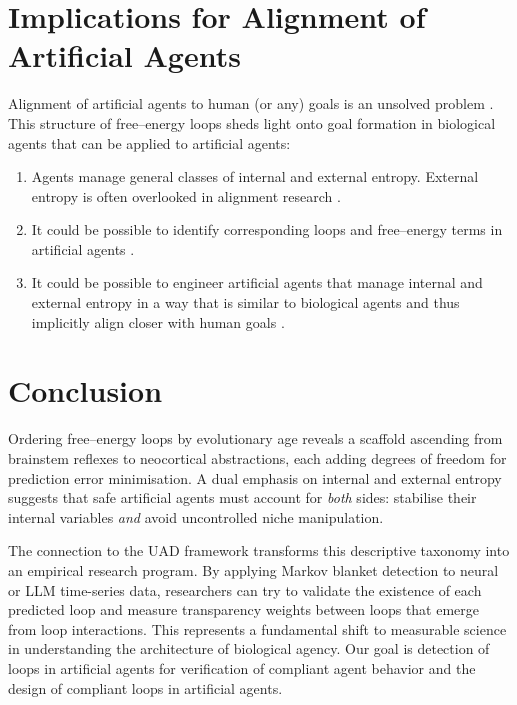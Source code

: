 \documentclass[10pt]{article}
\begin{document}
\section{Implications for Alignment of Artificial Agents}
Alignment of artificial agents to human (or any) goals is an unsolved problem \cite{russell2019human, ngo2022alignment, miri2024problem}.
This structure of free--energy loops sheds light onto goal formation in biological agents that can be applied to artificial agents:
\begin{enumerate}
\item Agents manage general classes of internal and external entropy. External entropy is often overlooked in alignment research \cite{critch2020ai, hubinger2019risks}.
\item It could be possible to identify corresponding loops and free--energy terms in artificial agents \cite{friston2022designing, sajid2021active}.
\item It could be possible to engineer artificial agents that manage internal and external entropy in a way that is similar to biological agents and thus implicitly align closer with human goals \cite{millidge2020deep, ramstead2022bayesian}.
\end{enumerate}

\section{Conclusion}
Ordering free--energy loops by evolutionary age reveals a scaffold ascending from brainstem reflexes to neocortical abstractions, 
each adding degrees of freedom for prediction error minimisation.  
A dual emphasis on internal and external entropy suggests that safe artificial agents must account for \emph{both} sides: 
stabilise their internal variables \emph{and} avoid uncontrolled niche manipulation.  

The connection to the UAD framework transforms this descriptive taxonomy into an empirical research program. By applying Markov blanket detection to neural or LLM time-series data, researchers can try to validate the existence of each predicted loop and measure transparency weights between loops that emerge from loop interactions. 
This represents a fundamental shift to measurable science in understanding the architecture of biological agency.
Our goal is detection of loops in artificial agents for verification of compliant agent behavior and the design of compliant loops in artificial agents.
\end{document}
